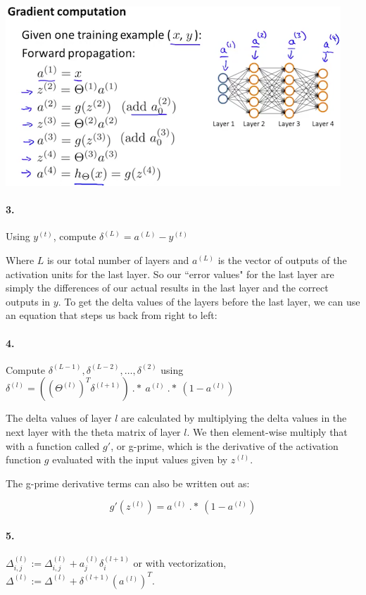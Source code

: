 \documentclass[UTF8]{article}
\begin{document}
\includegraphics[width = \textwidth]{NotePics/9_2_2.png}

\paragraph{3.} Using $y^{(t)}$, compute $\delta^{(L)} = a^{(L)} - y^{(t)}$

Where $L$ is our total number of layers and $a^{(L)}$ is the vector of outputs of the activation units for the last layer. So our ``error values" for the last layer are simply the differences of our actual results in the last layer and the correct outputs in $y$. To get the delta values of the layers before the last layer, we can use an equation that steps us back from right to left:

\paragraph{4.} Compute $\delta^{(L-1)}, \delta^{(L-2)},\dots,\delta^{(2)}$ using $\delta^{(l)} = ((\Theta^{(l)})^T \delta^{(l+1)})\ .*\ a^{(l)}\ .*\ (1 - a^{(l)})$

The delta values of layer $l$ are calculated by multiplying the delta values in the next layer with the theta matrix of layer $l$. We then element-wise multiply that with a function called $g'$, or g-prime, which is the derivative of the activation function $g$ evaluated with the input values given by $z^{(l)}$.

The g-prime derivative terms can also be written out as:

\[g'(z^{(l)}) = a^{(l)}\ .*\ (1 - a^{(l)})\]

\paragraph{5.} $\Delta^{(l)}_{i,j} := \Delta^{(l)}_{i,j} + a_j^{(l)} \delta_i^{(l+1)}$ or with vectorization, $\Delta^{(l)} := \Delta^{(l)} + \delta^{(l+1)}(a^{(l)})^T$.
\end{document}
